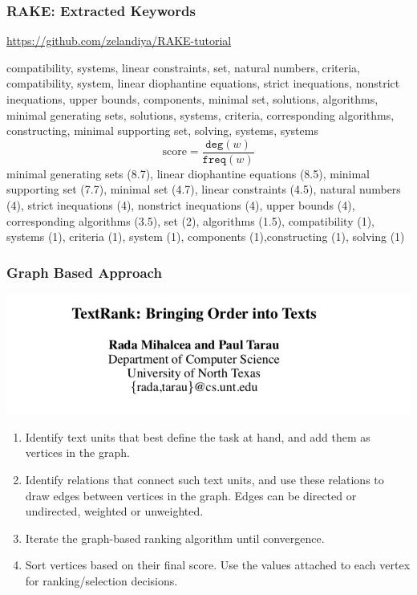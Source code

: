 \documentclass{beamer}
\begin{document}
\begin{frame}
\frametitle{RAKE: Extracted Keywords}

\url{https://github.com/zelandiya/RAKE-tutorial}

\vspace{0.1in}
compatibility, systems, linear constraints, set, natural numbers, criteria, compatibility, system, linear diophantine equations, strict inequations, nonstrict inequations, upper bounds, components, minimal set, solutions, algorithms, minimal generating sets, solutions, systems, criteria, corresponding algorithms, constructing, minimal supporting set, solving, systems, systems
\pause
\[
\text{score} = \frac{\texttt{deg}(w)}{\texttt{freq}(w)}
\]
\pause
minimal generating sets (8.7), linear diophantine equations (8.5), minimal supporting set (7.7), minimal set (4.7), linear constraints (4.5), natural numbers (4), strict inequations (4), nonstrict inequations (4), upper bounds (4), corresponding algorithms (3.5), set (2), algorithms (1.5), compatibility (1), systems (1), criteria (1), system (1), components (1),constructing (1), solving (1)
\end{frame}

\begin{frame}
\frametitle{Graph Based Approach}
\includegraphics[width= \textwidth]{img/textrank}

\begin{enumerate}
\item Identify text units that best define the task at hand, and add them as vertices in the graph.
\item Identify relations that connect such text units, and use these relations to draw edges between vertices in the graph. Edges can be directed or undirected, weighted or unweighted.
\item Iterate the graph-based ranking algorithm until convergence.
\item Sort vertices based on their final score. Use the values attached to each vertex for ranking/selection decisions.
\end{enumerate}
\end{frame}
\end{document}
